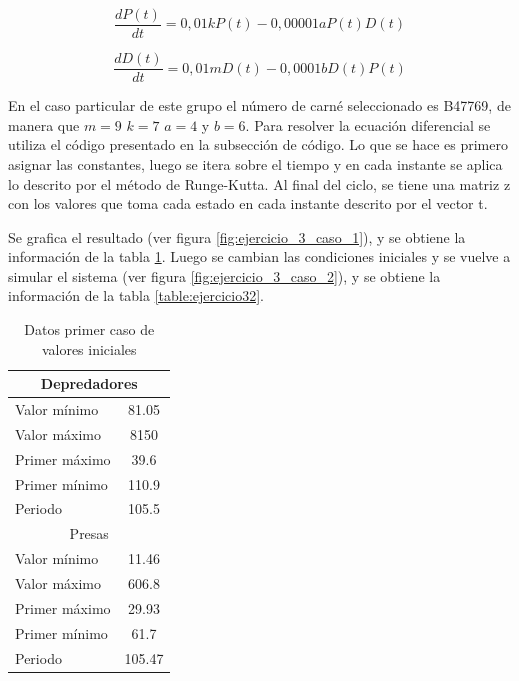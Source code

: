 \documentclass[12pt,letterpaper]{article}
\begin{document}
\begin{equation}
\frac{dP(t)}{dt}=0,01kP(t)-0,00001aP(t)D(t)
\label{eq:diferencial1}
\end{equation}

\begin{equation}
\frac{dD(t)}{dt}=0,01mD(t)-0,0001bD(t)P(t)
\label{eq:diferencial2}
\end{equation}

En el caso particular de este grupo el número de carné seleccionado es B47769, de manera que $m=9$ $k=7$ $a=4$ y $b=6$. Para resolver la ecuación diferencial se utiliza el código presentado en la subsección de código. Lo que se hace es primero asignar las constantes, luego se itera sobre el tiempo y en cada instante se aplica lo descrito por el método de Runge-Kutta. Al final del ciclo, se tiene una matriz z con los valores que toma cada estado en cada instante descrito por el vector t. 

Se grafica el resultado (ver figura \ref{fig:ejercicio_3_caso_1}), y se obtiene la información de la tabla \ref{table:ejercicio31}. Luego se cambian las condiciones iniciales y se vuelve a simular el sistema (ver figura \ref{fig:ejercicio_3_caso_2}), y se obtiene la información de la tabla \ref{table:ejercicio32}.


\begin{table}
\caption{Datos primer caso de valores iniciales}
\label{table:ejercicio31}
\centering
\begin{tabular}{| l | c |}
  \hline
 \multicolumn{2}{|c|}{Depredadores} \\
 \hline
 Valor mínimo &81.05 \\
 Valor máximo &8150\\
 Primer máximo&39.6\\
 Primer mínimo&110.9\\
 Periodo      &105.5\\
 \hline
 \multicolumn{2}{|c|}{Presas} \\
 \hline
 Valor mínimo &11.46\\
 Valor máximo &606.8\\
 Primer máximo&29.93\\
 Primer mínimo&61.7\\
 Periodo      &105.47\\
 \hline
\end{tabular}
\end{table}
\end{document}
